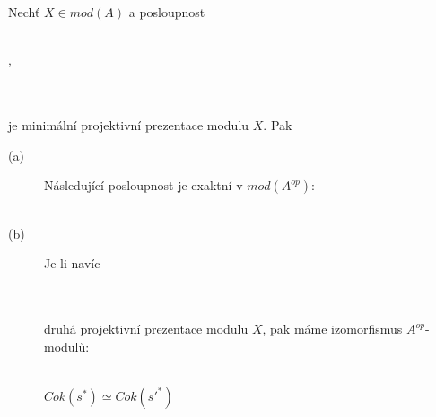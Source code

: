      \begin{lem}\label{lemma-cok*}
       Nechť $X\in mod(A)$ a posloupnost  \\\\
       \centerline{,}\\\\ je minimální projektivní prezentace modulu $X$. Pak
       \begin{description}
         \item[(a)] Následující posloupnost je exaktní v $mod(A^{op})$: \\\\
         \centerline{}       
         \item[(b)] Je-li navíc  \\
         \centerline{} \\\\
          druhá projektivní prezentace modulu $X$, pak máme izomorfismus 
          $A^{op}$-modulů: \\\\
          \centerline{$Cok(s^*)\simeq Cok(s'^*)$}
       \end{description}
     \end{lem}
